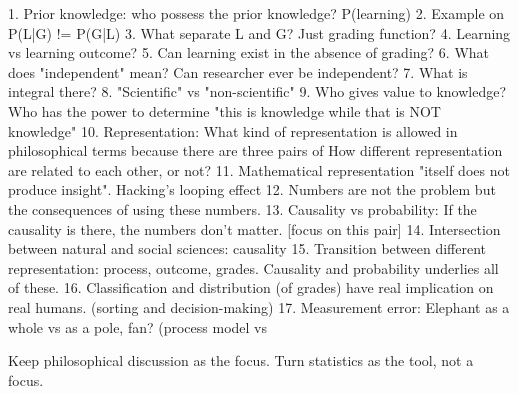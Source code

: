 \documentclass[
    a4paper,                %
    11pt,                   %
    stu,                    %
    floatsintext,           %
    biblatex,               %
    colorlinks=true,        %
    linkcolor=red,          %
    anchorcolor=black,      %
    citecolor=blue,         %
    urlcolor=blue,          %
    bookmarks=true,         %
    bookmarksopen=false,    %
    bookmarksnumbered=true, %
    dvipsnames              %
]{apa7}
\begin{document}
1. Prior knowledge: who possess the prior knowledge? P(learning)
2. Example on P(L|G) != P(G|L)
3. What separate L and G? Just grading function?
4. Learning vs learning outcome?
5. Can learning exist in the absence of grading?
6. What does "independent" mean? Can researcher ever be independent?
7. What is integral there?
8. "Scientific" vs "non-scientific"
9. Who gives value to knowledge? Who has the power to determine "this is knowledge while that is NOT knowledge"
10. Representation: What kind of representation is allowed in philosophical terms because there are three pairs of How different representation are related to each other, or not?
11. Mathematical representation "itself does not produce insight". Hacking's looping effect
12. Numbers are not the problem but the consequences of using these numbers.
13. Causality vs probability: If the causality is there, the numbers don't matter. [focus on this pair]
14. Intersection between natural and social sciences: causality
15. Transition between different representation: process, outcome, grades. Causality and probability underlies all of these.
16. Classification and distribution (of grades) have real implication on real humans. (sorting and decision-making)
17. Measurement error: Elephant as a whole vs as a pole, fan? (process model vs 

Keep philosophical discussion as the focus. Turn statistics as the tool, not a focus.
\end{document}
